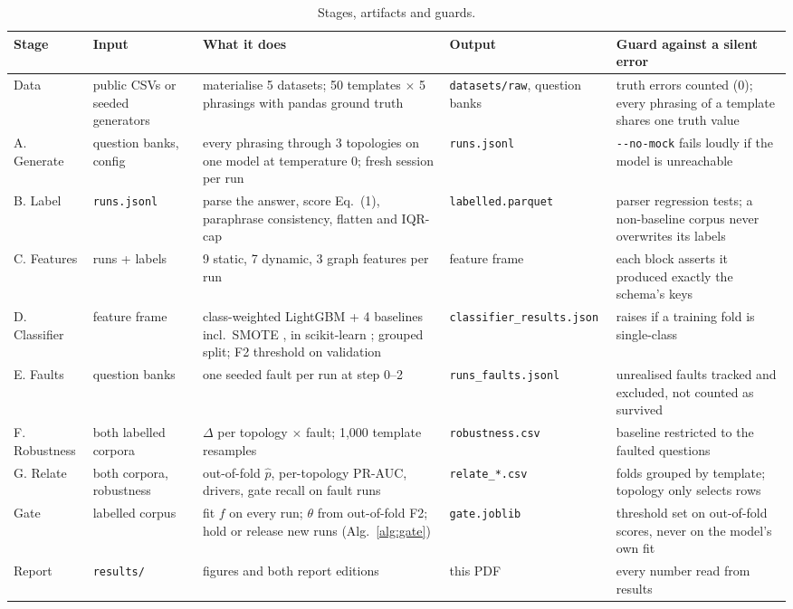 \documentclass[10pt,twocolumn]{article}
\begin{document}
\begin{table}[t]
\caption{Stages, artifacts and guards.}\label{tab:stages}
\footnotesize
\begin{tabularx}{\textwidth}{@{}P{18mm}P{24mm}LP{30mm}L@{}}
\toprule
Stage & Input & What it does & Output & Guard against a silent error\\
\midrule
Data & public CSVs or seeded generators & materialise 5 datasets; 50 templates $\times$ 5 phrasings with pandas ground
  truth & \texttt{datasets/}\allowbreak\texttt{raw}, question banks & truth errors counted (0); every phrasing of a template shares one
  truth value\\
A. Generate & question banks, config & every phrasing through 3 topologies on one model at temperature 0; fresh
  session per run & \texttt{runs.jsonl} & \texttt{-{}-no-mock} fails loudly if the model is unreachable\\
B. Label & \texttt{runs.jsonl} & parse the answer, score Eq.~(1), paraphrase consistency, flatten and IQR-cap &
  \texttt{labelled.parquet} & parser regression tests; a non-baseline corpus never overwrites its labels\\
C. Features & runs + labels & 9 static, 7 dynamic, 3 graph features per run & feature frame & each block asserts
  it produced exactly the schema's keys\\
D. Classifier & feature frame & class-weighted LightGBM \cite{lightgbm} + 4 baselines incl.\ SMOTE \cite{smote}, in scikit-learn \cite{sklearn}; grouped split; F2 threshold on validation &
  \texttt{classifier\_}\allowbreak\texttt{results.json} & raises if a training fold is single-class\\
E. Faults & question banks & one seeded fault per run at step 0--2 & \texttt{runs\_}\allowbreak\texttt{faults.jsonl} & unrealised
  faults tracked and excluded, not counted as survived\\
F. Robustness & both labelled corpora & $\Delta$ per topology $\times$ fault; 1,000 template resamples &
  \texttt{robustness.csv} & baseline restricted to the faulted questions\\
G. Relate & both corpora, robustness & out-of-fold $\hat{p}$, per-topology PR-AUC, drivers, gate recall on fault
  runs & \texttt{relate\_*.csv} & folds grouped by template; topology only selects rows\\
Gate & labelled corpus & fit $f$ on every run; $\theta$ from out-of-fold F2; hold or release new runs
  (Alg.~\ref{alg:gate}) & \texttt{gate.joblib} & threshold set on out-of-fold scores, never on the model's own
  fit\\
Report & \texttt{results/} & figures and both report editions & this PDF & every number read from results\\
\bottomrule
\end{tabularx}
\end{table}
\end{document}
